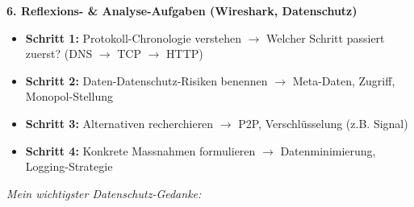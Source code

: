 \begin{mainBox}[title=Methodische Anleitung zur Durchführung der Prüfungsaufgaben]
    \textbf{\large 6. Reflexions- \& Analyse-Aufgaben (Wireshark, Datenschutz)}
    \begin{itemize}[topsep=2pt, itemsep=2pt]
        \item \textbf{Schritt 1:} Protokoll-Chronologie verstehen $\rightarrow$ Welcher Schritt passiert zuerst? (\gls{DNS} $\rightarrow$ \gls{TCP} $\rightarrow$ \gls{HTTP})
        \item \textbf{Schritt 2:} Daten-Datenschutz-Risiken benennen $\rightarrow$ Meta-Daten, Zugriff, Monopol-Stellung
        \item \textbf{Schritt 3:} Alternativen recherchieren $\rightarrow$ \gls{P2P}, Verschlüsselung (z.B. Signal)
        \item \textbf{Schritt 4:} Konkrete Massnahmen formulieren $\rightarrow$ Datenminimierung, Logging-Strategie
    \end{itemize}

    \textit{Mein wichtigster Datenschutz-Gedanke:} \underline{\hspace{7cm}}

\end{mainBox}
